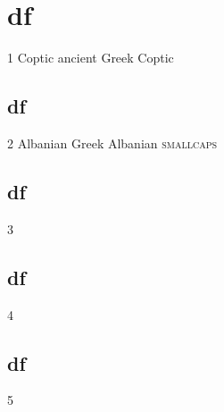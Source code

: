 \documentclass[albanian]{article}
\begin{document}
\part{df}

1 Coptic \textgreek[variant=ancient]{ancient Greek} Coptic

\begin{albanian}%

\part{df}

2 Albanian \textgreek{Greek} Albanian \textsc{smallcaps}

\end{albanian}%
\begin{divehi}%

\part{df}

3

\end{divehi}%
\begin{syriac}%

\part{df}

4

\end{syriac}%
\begin{divehi}%

\part{df}

5
\end{divehi}%

\begin{albanian}%
\end{albanian}%
\end{document}
